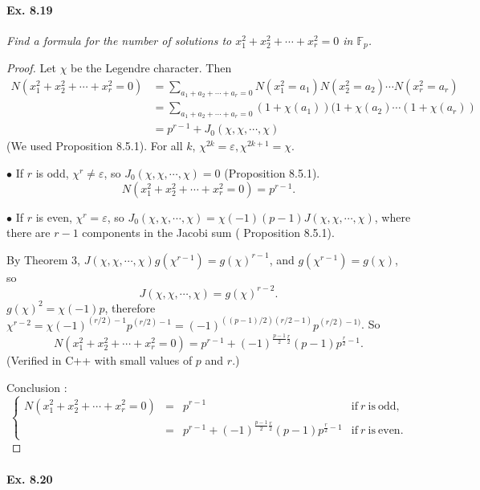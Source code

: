 \documentclass[11pt,a4paper]{article}
\newcommand{\F}{\mathbb{F}}
\begin{document}
{\paragraph{Ex. 8.19}

{\it Find a formula for the number of solutions to $x_1^2+x_2^2+\cdots+x_r^2 = 0$ in $\F_p$.
}

\begin{proof}
Let $\chi$ be the Legendre character. Then
\begin{align*}
N(x_1^2+x_2^2+\cdots+x_r^2=0) &= \sum\limits_{a_1+a_2+\cdots+a_r=0} N(x_1^2=a_1)N(x_2^2=a_2)\cdots N(x_r^2 = a_r)\\
&=\sum\limits_{a_1+a_2+\cdots+a_r=0} (1+\chi(a_1))(1+\chi(a_2)\cdots(1+\chi(a_r))\\
&=p^{r-1} + J_0(\chi,\chi,\cdots,\chi)
\end{align*}
(We used Proposition 8.5.1).
For all $k$, $\chi^{2k} = \varepsilon, \chi^{2k+1} = \chi$.

$\bullet$ If $r$ is odd, $\chi^r \neq \varepsilon$, so $J_0(\chi,\chi,\cdots,\chi) = 0$ (Proposition 8.5.1).
$$N(x_1^2+x_2^2+\cdots+x_r^2=0)  = p^{r-1}.$$

$\bullet$ If $r$ is even, $\chi^r = \varepsilon$, so $J_0(\chi,\chi,\cdots,\chi) = \chi(-1)(p-1)J(\chi,\chi,\cdots, \chi)$, where there are  $r-1$ components in the Jacobi sum ( Proposition 8.5.1).

By Theorem 3, $J(\chi,\chi,\cdots,\chi) g(\chi^{r-1}) = g(\chi)^{r-1}$, and  $g(\chi^{r-1}) = g(\chi)$, so
$$J(\chi,\chi,\cdots,\chi)=g(\chi)^{r-2}.$$
$g(\chi)^2 = \chi(-1) p$, therefore $\chi^{r-2} = \chi(-1)^{(r/2)-1} p^{(r/2)-1} = (-1)^{((p-1)/2) (r/2-1)}p^{(r/2)-1)}$. So
$$N(x_1^2+x_2^2+\cdots+x_r^2=0)  = p^{r-1}+(-1)^{\frac{p-1}{2} \frac{r}{2}} (p-1)p^{\frac{r}{2}-1}.$$
(Verified in C++ with small values of $p$ and $r$.)

Conclusion :
$$
\left\{
\begin{array}{ccll}
 N(x_1^2+x_2^2+\cdots+x_r^2=0)  & =  & p^{r-1}  &\mathrm{if}\ r\ \mathrm{is}\ \mathrm{odd},\\
  &  = &   p^{r-1}+(-1)^{\frac{p-1}{2} \frac{r}{2}} (p-1)p^{\frac{r}{2}-1} &\mathrm{if}\ r\  \mathrm{is}\ \mathrm{even}.
\end{array}
\right.
$$
\end{proof}

\paragraph{Ex. 8.20}

}
\end{document}
